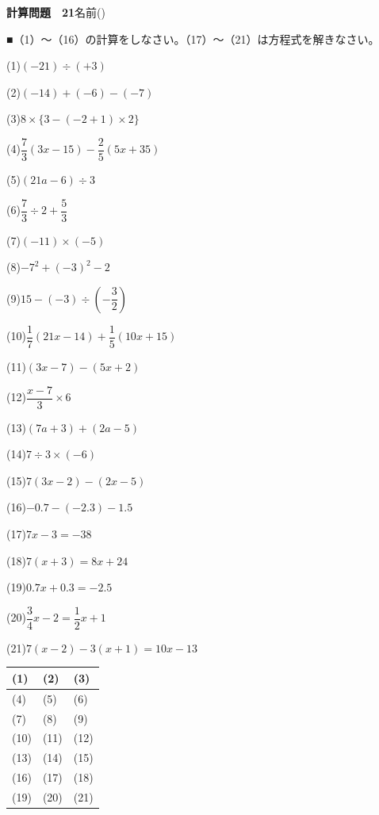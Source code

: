 \documentclass[a4paper,11pt]{ltjsarticle}
\newlength{\qcol}\setlength{\qcol}{0.47\textwidth}
\newlength{\qgap}
\newlength{\anscolw}\setlength{\anscolw}{0.30\textwidth}
\newlength{\ansh}
\newcommand{\Q}[2]{\parbox[t]{\qcol}{\raggedright (#1)\hspace{0.6em}$\displaystyle #2$}}
\newcommand{\QR}[4]{\Q{#1}{#2}\hfill\Q{#3}{#4}\par\vspace{\qgap}}
\newcommand{\anscell}[1]{\rule[-\ansdrop]{0pt}{\ansh}(#1)}
\newlength{\ansdrop}
\begin{document}
{\large\bfseries 計算問題　21}\hfill 名前(\underline{\hspace{32mm}})\par\vspace{3mm}
■（1）〜（16）の計算をしなさい。（17）〜（21）は方程式を解きなさい。\par\vspace{3mm}
\setlength{\qgap}{5.4mm}
\QR{1}{(-21)\div(+3)}{2}{(-14)+(-6)-(-7)}
\QR{3}{8\times\{3-(-2+1)\times2\}}{4}{\dfrac{7}{3}(3x-15)-\dfrac{2}{5}(5x+35)}
\QR{5}{(21a-6)\div3}{6}{\dfrac{7}{3}\div2+\dfrac{5}{3}}
\QR{7}{(-11)\times(-5)}{8}{-7^2+(-3)^2-2}
\QR{9}{15-(-3)\div\left(-\dfrac{3}{2}\right)}{10}{\dfrac{1}{7}(21x-14)+\dfrac{1}{5}(10x+15)}
\QR{11}{(3x-7)-(5x+2)}{12}{\dfrac{x-7}{3}\times6}
\QR{13}{(7a+3)+(2a-5)}{14}{7\div3\times(-6)}
\QR{15}{7(3x-2)-(2x-5)}{16}{-0.7-(-2.3)-1.5}
\QR{17}{7x-3=-38}{18}{7(x+3)=8x+24}
\QR{19}{0.7x+0.3=-2.5}{20}{\dfrac{3}{4}x-2=\dfrac{1}{2}x+1}
\vspace{1mm}
\Q{21}{7(x-2)-3(x+1)=10x-13}\par\vspace{3mm}
\setlength{\ansh}{9.5mm}\setlength{\ansdrop}{6mm}%
\begin{center}\begin{tabular}{|p{\anscolw}|p{\anscolw}|p{\anscolw}|}\hline
\anscell{1} & \anscell{2} & \anscell{3} \\\hline
\anscell{4} & \anscell{5} & \anscell{6} \\\hline
\anscell{7} & \anscell{8} & \anscell{9} \\\hline
\anscell{10} & \anscell{11} & \anscell{12} \\\hline
\anscell{13} & \anscell{14} & \anscell{15} \\\hline
\anscell{16} & \anscell{17} & \anscell{18} \\\hline
\anscell{19} & \anscell{20} & \anscell{21} \\\hline
\end{tabular}\end{center}
\end{document}
